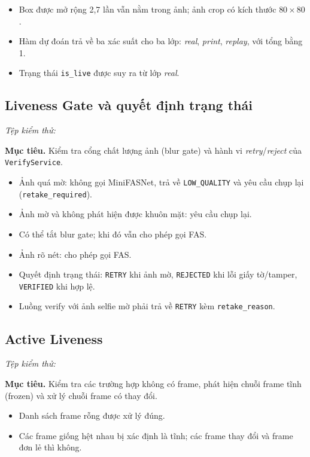 \documentclass[12pt,a4paper]{article}
\begin{document}
\begin{itemize}
  \item Box được mở rộng 2,7 lần vẫn nằm trong ảnh; ảnh crop có kích thước $80\times 80$.
  \item Hàm dự đoán trả về ba xác suất cho ba lớp: \textit{real}, \textit{print}, \textit{replay}, với tổng bằng 1.
  \item Trạng thái \texttt{is\_live} được suy ra từ lớp \textit{real}.
\end{itemize}

\subsection{Liveness Gate và quyết định trạng thái}
\textit{Tệp kiểm thử:} 

\textbf{Mục tiêu.} Kiểm tra cổng chất lượng ảnh (blur gate) và hành vi \textit{retry}/\textit{reject} của
\texttt{VerifyService}.

\begin{itemize}
  \item Ảnh quá mờ: không gọi MiniFASNet, trả về \texttt{LOW\_\allowbreak QUALITY} và yêu cầu chụp lại (\texttt{retake\_\allowbreak required}).
  \item Ảnh mờ và không phát hiện được khuôn mặt: yêu cầu chụp lại.
  \item Có thể tắt blur gate; khi đó vẫn cho phép gọi FAS.
  \item Ảnh rõ nét: cho phép gọi FAS.
  \item Quyết định trạng thái: \texttt{RETRY} khi ảnh mờ, \texttt{REJECTED} khi lỗi giấy tờ/tamper,
        \texttt{VERIFIED} khi hợp lệ.
  \item Luồng verify với ảnh selfie mờ phải trả về \texttt{RETRY} kèm \texttt{retake\_reason}.
\end{itemize}

\subsection{Active Liveness}
\textit{Tệp kiểm thử:} 

\textbf{Mục tiêu.} Kiểm tra các trường hợp không có frame, phát hiện chuỗi frame tĩnh (frozen) và xử lý chuỗi
frame có thay đổi.

\begin{itemize}
  \item Danh sách frame rỗng được xử lý đúng.
  \item Các frame giống hệt nhau bị xác định là tĩnh; các frame thay đổi và frame đơn lẻ thì không.
\end{itemize}
\end{document}
